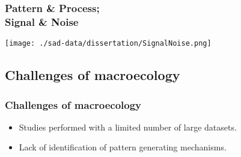 \documentclass[14pt]{beamer}
\begin{document}
\begin{frame}
\frametitle{Pattern \& Process;\\ Signal \& Noise}
\begin{center}
\texttt{[image: ./sad-data/dissertation/SignalNoise.png]}
\end{center}
\end{frame}



\subsection{Challenges of macroecology}
\begin{frame}[t]
\frametitle{Challenges of macroecology}
\begin{itemize}
\item Studies performed with a limited number of large datasets.
\item Lack of identification of pattern generating mechanisms.
\end{itemize}
\end{frame}
\end{document}
